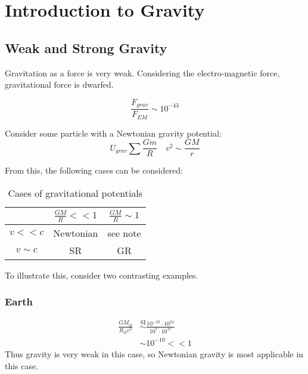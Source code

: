 \setchapterpreamble[u]{\margintoc}
\chapter{Introduction to Gravity}

\section{Weak and Strong Gravity}
Gravitation as a force is very weak. Considering the electro-magnetic force, gravitational force is dwarfed.

$$ \frac{F_{grav}}{F_{EM}} \sim 10^{-43} $$

Consider some particle with a Newtonian gravity potential:
$$ U_{grav} \sum \frac{Gm}{R} \quad v^2 \sim \frac{GM}{r} $$

From this, the following cases can be considered:

\begin{table}[h]
    \centering
    \begin{tabular}{c|c|c}
         & $\frac{GM}{R} << 1$ & $\frac{GM}{R} \sim 1$\\ \hline
        $v<<c$ & Newtonian & see note \\ \hline
        $v \sim c$ & SR & GR\\
    \end{tabular}
    \caption{Cases of gravitational potentials}
    \label{tab:grav_strength}
\end{table}

To illustrate this, consider two contrasting examples.

\subsection{Earth}
\begin{align*}
    \frac{GM_\oplus}{R_\oplus c^2} &\overset{\text{SI}}{\sim} \frac{10^{-10} \cdot 10^{24}}{10^7 \cdot 10^{17}} \\ & \sim 10^{-10} << 1 
\end{align*}
Thus gravity is very weak in this case, so Newtonian gravity is most applicable in this case.

